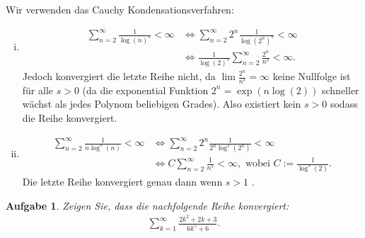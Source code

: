 \documentclass[a4paper, 20]{exam}
\newtheorem{ex}{Aufgabe}
\begin{document}
\begin{solution} Wir verwenden das Cauchy Kondensationsverfahren:
\begin{enumerate}[i)]
\item 
\begin{align*}
\sum_{n=2}^\infty \frac{1}{\log(n)^s}< \infty &\iff \sum_{n=2} ^\infty  2^n \frac{1}{\log(2^n)^s}< \infty  \\
& \iff \frac{1}{\log(2)^s} \sum_{n=2}^\infty \frac{2^n}{n^s} < \infty.
\end{align*}
Jedoch konvergiert die letzte Reihe nicht, da $\lim \frac{2^n }{n^s} = \infty$ keine Nullfolge ist für alle $s >0$ (da die exponential Funktion $2^n= \exp(n \log(2))$ schneller wächst als jedes Polynom beliebigen Grades). Also existiert kein $s>0$ sodass die Reihe konvergiert. 
\item
\begin{align*}
\sum_{n=2}^\infty \frac{1}{n \log^s(n)}< \infty &\iff \sum_{n=2}^\infty 2^n \frac{1}{2^n\log^s(2^n)}< \infty \\
& \iff C\sum_{n=2}^\infty \frac{1}{n^s}< \infty, \text{ wobei } C:= \frac{1}{\log^s(2)}.
\end{align*}
Die letzte Reihe konvergiert genau dann wenn $s > 1$ .
\end{enumerate}

\end{solution}


\begin{ex} Zeigen Sie, dass die nachfolgende Reihe konvergiert:
\begin{align*}
 \sum_{k=1}^\infty \frac{2k^2+2k+3}{6k^5+6}.
\end{align*}
\end{ex}
\end{document}
